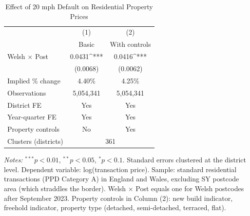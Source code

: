 \begin{table}[htbp]
\centering
\caption{Effect of 20 mph Default on Residential Property Prices}
\label{tab:property}
\begin{adjustbox}{max width=\textwidth}
\begin{tabular}{lcc}
\hline\hline
 & (1) & (2) \\
 & Basic & With controls \\
\hline
Welsh $\times$ Post & 0.0431^{***} & 0.0416^{***} \\
 & (0.0068) & (0.0062) \\
Implied \% change & 4.40\% & 4.25\% \\
\hline
Observations & 5,054,341 & 5,054,341 \\
District FE & Yes & Yes \\
Year-quarter FE & Yes & Yes \\
Property controls & No & Yes \\
Clusters (districts) & \multicolumn{2}{c}{361} \\
\hline\hline
\end{tabular}
\end{adjustbox}
\smallskip
\begin{minipage}{\textwidth}
\footnotesize
\textit{Notes:} $^{***}p<0.01$, $^{**}p<0.05$, $^{*}p<0.1$. Standard errors clustered at the district level. Dependent variable: log(transaction price). Sample: standard residential transactions (PPD Category A) in England and Wales, excluding SY postcode area (which straddles the border). Welsh $\times$ Post equals one for Welsh postcodes after September 2023. Property controls in Column (2): new build indicator, freehold indicator, property type (detached, semi-detached, terraced, flat).
\end{minipage}
\end{table}
